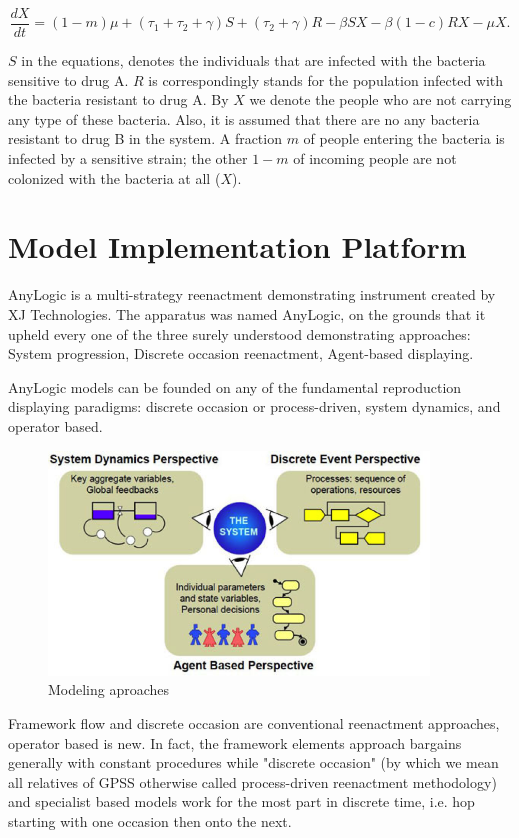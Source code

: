 \begin{equation}
\frac{dX}{dt} = (1 - m) \mu + (\tau_1 + \tau_2 + \gamma) S + (\tau_2 + \gamma) R - \beta S X - \beta (1-c) R X - \mu X.
\end{equation}

$S$ in the equations, denotes the individuals that are infected with the bacteria sensitive to drug A. $R$ is correspondingly stands for the population infected with the bacteria resistant to drug A. By $X$ we denote the people who are not carrying any type of these bacteria. Also, it is assumed that there are no any bacteria resistant to drug B in the system. A fraction $m$ of people entering the bacteria is infected by a sensitive strain; the other $1-m$ of incoming people are not colonized with the bacteria at all ($X$).

\section{Model Implementation Platform}

AnyLogic is a multi-strategy reenactment demonstrating instrument created by XJ Technologies. The apparatus was named AnyLogic, on the grounds that it upheld every one of the three surely understood demonstrating approaches: System progression, Discrete occasion reenactment, Agent-based displaying.

AnyLogic models can be founded on any of the fundamental reproduction displaying paradigms: discrete occasion or process-driven, system dynamics, and operator based.


\begin{figure}
   \centering
	\includegraphics[width=0.9\textwidth]{img/system}
	\caption[Clear]{Modeling aproaches}
\end{figure}

Framework flow and discrete occasion are conventional reenactment approaches, operator based is new. In fact, the framework elements approach bargains generally with constant procedures while "discrete occasion" (by which we mean all relatives of GPSS otherwise called process-driven reenactment methodology) and specialist based models work for the most part in discrete time, i.e. hop starting with one occasion then onto the next.

